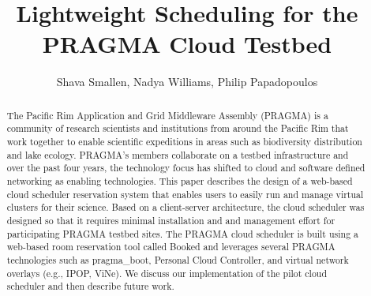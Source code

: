 \documentclass[times]{cpeauth}
\begin{document}

\sloppy %

\title{Lightweight Scheduling for the PRAGMA Cloud Testbed} 

\author{Shava Smallen\corrauth, Nadya Williams, Philip Papadopoulos}

\address{San Diego Supercomputer Center\break
University of California San Diego, 9500 Gilman Drive, La Jolla, CA 92093}\break


\begin{abstract}
The Pacific Rim Application and Grid Middleware Assembly (PRAGMA) is a community of research scientists and institutions from around the Pacific Rim that work together to enable scientific expeditions in areas such as biodiversity distribution and lake ecology.  PRAGMA's members collaborate on a testbed infrastructure and over the past four years, the technology focus has shifted to cloud and software defined networking as enabling technologies.  This paper describes the design of a web-based cloud scheduler reservation system that enables users to easily run and manage virtual clusters for their science.  Based on a client-server architecture, the cloud scheduler was designed so that it requires minimal installation and and management effort for participating PRAGMA testbed sites.   The PRAGMA cloud scheduler is built using a web-based room reservation tool called Booked and leverages several PRAGMA technologies such as pragma\_boot, Personal Cloud Controller,  and virtual network overlays (e.g., IPOP, ViNe).  We discuss our implementation of the pilot cloud scheduler and then describe future work.   
\end{abstract}


\maketitle

\vspace{-6pt}


\end{document}
